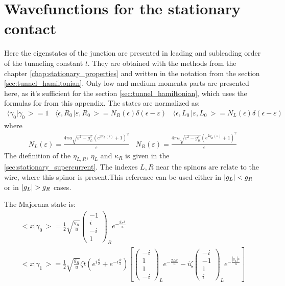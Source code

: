 \chapter{Wavefunctions for the stationary contact}
\label{app:wavefunctions_with_corrections}

Here the eigenstates of the junction are presented in leading and subleading order of the tunneling constant $ t $. They are obtained with the methods from the chapter \ref{chap:stationary_properties} and written in the notation from the section \ref{sec:tunnel_hamiltonian}. Only low and medium momenta parts are presented here, as it's sufficient for the section \ref{sec:tunnel_hamiltonian}, which uses the formulas for from this appendix. The states are normalized as:
\begin{gather}
	\big\langle\gamma_{0}\big|\gamma_{0}\,\big>=1
	~~~~
	\big\langle\epsilon,R_{0}\,\big|\varepsilon,R_{0}\,\big>=N_{R}\left(\epsilon\right)\delta\left(\epsilon-\varepsilon\right)
	~~~~
	\big\langle\epsilon,L_{0}\,\big|\varepsilon,L_{0}\,\big>=N_{L}\left(\epsilon\right)\delta\left(\epsilon-\varepsilon\right)
\end{gather}
where
\begin{gather}
\label{N_L_N_R_definition}
	N_{L}\left(\varepsilon\right)=\frac{4\pi u\sqrt{\varepsilon^{2}-g_{L}^{2}}\left(e^{2\ensuremath{\kappa_{L}\left(\varepsilon\right)}}+1\right)^{2}}{\varepsilon}
	~~~~
	N_{R}\left(\varepsilon\right)=\frac{4\pi u\sqrt{\varepsilon^{2}-g_{R}^{2}}\left(e^{2\eta_{R}\left(\varepsilon\right)}+1\right)^{2}}{\varepsilon}
\end{gather}
The diefinition of the $ \eta_{L,R} $, $ \eta_L $ and $ \kappa_R $ is given in the \ref{sec:stationary_supercurrent}. The indexes $ L,R $  near the spinors are relate to the wire, where this spinor is present.This reference can be used either in $ \left|g_{L}\right|<g_{R} $ or in $ \abs{g_{L}}>g_{R} $ cases.

The Majorana state is:
\begin{gather}
	\big<x\big|\gamma_{0}\,\big>=\frac{1}{2}\sqrt{\frac{g_{R}}{u}}\begin{pmatrix}-1\\
	i\\
	-i\\
	1
	\end{pmatrix}_{R}e^{-\frac{g_{R}x}{u}}
	\\
	\big<x\big|\gamma_{1}\,\big>=\frac{1}{2}\sqrt{\frac{g_{R}}{u}}\zeta t\left(e^{i\frac{\phi}{2}}+e^{-i\frac{\phi}{2}}\right)\left[\begin{pmatrix}-i\\
	1\\
	1\\
	-i
	\end{pmatrix}_{L}e^{-\frac{2\Delta x}{u}}-i\zeta\begin{pmatrix}-i\\
	-1\\
	1\\
	i
	\end{pmatrix}_{L}e^{-\frac{\left|g_{L}\right|x}{u}}\right]
\end{gather}

